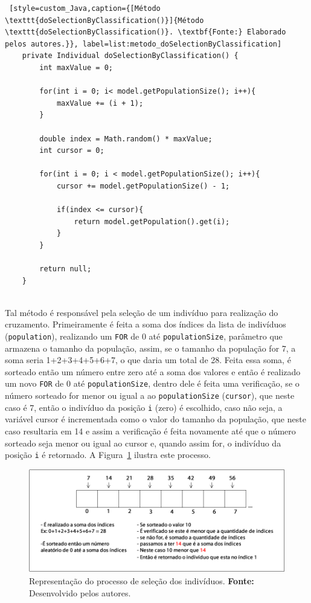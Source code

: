 \begin{lstlisting} [style=custom_Java,caption={[Método \texttt{doSelectionByClassification()}]{Método \texttt{doSelectionByClassification()}. \textbf{Fonte:} Elaborado pelos autores.}}, label=list:metodo_doSelectionByClassification] 
	private Individual doSelectionByClassification() {
		int maxValue = 0;
		
		for(int i = 0; i< model.getPopulationSize(); i++){
			maxValue += (i + 1);
		}
		
		double index = Math.random() * maxValue;
		int cursor = 0;
		
		for(int i = 0; i < model.getPopulationSize(); i++){
			cursor += model.getPopulationSize() - 1;
			
			if(index <= cursor){
				return model.getPopulation().get(i);
			}
		}
		
		return null;
	}


\end{lstlisting}

\par Tal método é responsável pela seleção de um indivíduo para realização do cruzamento. Primeiramente
é feita a soma dos índices da lista de indivíduos (\texttt{population}), realizando um \texttt{FOR} de 0 até
\texttt{populationSize}, parâmetro que armazena o tamanho da população, assim, se o tamanho da população for
7, a soma seria 1+2+3+4+5+6+7, o que daria um total de 28. Feita essa soma, é sorteado então um número 
entre zero até a soma dos valores e então é realizado um novo \texttt{FOR} de 0 até \texttt{populationSize},
dentro dele é feita uma verificação, se o número sorteado for menor ou igual 
a ao \texttt{populationSize} (\texttt{cursor}), que neste caso é 7, então o indivíduo da posição \texttt{i} (zero) é escolhido, 
caso não seja, a variável cursor é incrementada como o valor do tamanho da população, que neste caso resultaria 
em 14 e assim a verificação é feita novamente até que o número sorteado seja menor ou igual ao cursor e, quando assim
for, o indivíduo da posição \texttt{i} é retornado. A Figura~\ref{fig:ex_selecao} ilustra este processo.

\begin{figure}[h!]
	\centerline{\includegraphics[scale=0.7]{./imagens/selecao.png}}
	\caption[Representação do processo de seleção dos indivíduos.]
	{Representação do processo de seleção dos indivíduos.
		\textbf{Fonte:} Desenvolvido pelos autores.}
	\label{fig:ex_selecao}
\end{figure}

